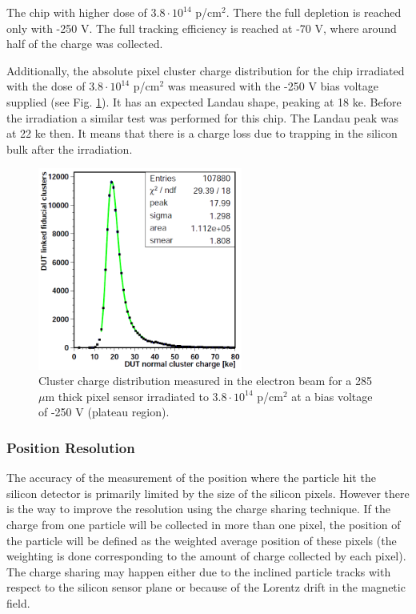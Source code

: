 The chip with higher dose of $3.8 \cdot 10^{14}$ p/cm$^2$. There the full depletion is reached only with -250 V. The full tracking efficiency
is reached at -70 V, where around half of the charge was collected.

Additionally, the absolute pixel cluster charge distribution for the chip irradiated with the dose of $3.8 \cdot 10^{14}$ p/cm$^2$ was measured
with the -250 V bias voltage supplied (see Fig. \ref{fig:Landau}). It has an expected Landau shape, peaking at 18 ke. Before the irradiation a 
similar test was performed for this chip. The Landau peak was at 22 ke then. It means that there is a charge loss due to trapping in the silicon
bulk after the irradiation.

\begin{figure}[t]
 \centering
 \includegraphics[width=0.6\textwidth]{021_pixel_upgrade/plots/Landau.png}
 \caption{Cluster charge distribution measured in the electron beam for a 285$\mu$m thick pixel sensor irradiated to $3.8 \cdot 10^{14}$ p/cm$^2$ 
 at a bias voltage of -250 V (plateau region).}
 \label{fig:Landau}
\end{figure}

\subsubsection{Position Resolution}

The accuracy of the measurement of the position where the particle hit the silicon detector is primarily limited by the size of the silicon pixels.
However there is the way to improve the resolution using the charge sharing technique. If the charge from one particle will be collected in more
than one pixel, the position of the particle will be defined as the weighted average position of these pixels (the weighting is done corresponding 
to the amount of charge collected by each pixel). The charge sharing may happen either due to the inclined particle tracks with respect to the 
silicon sensor plane or because of the Lorentz drift in the magnetic field.


